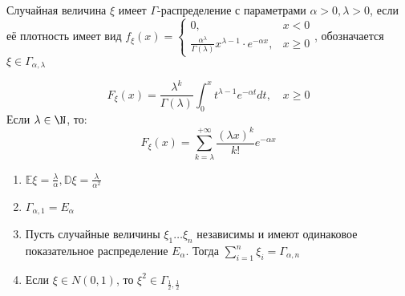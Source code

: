 \begin{definition}
    Случайная величина \(\xi\) имеет \(\Gamma\)-распределение с параметрами \(\alpha > 0, \lambda > 0\), если её плотность имеет вид \(f_\xi(x) = \begin{cases}
        0,                                                                            & x < 0    \\
        \frac{\alpha^\lambda}{\Gamma(\lambda)} x^{\lambda - 1} \cdot e^{ - \alpha x}, & x \geq 0
    \end{cases} \),
    обозначается \(\xi \in \Gamma_{\alpha, \lambda}\)
\end{definition}

\[F_\xi(x) = \frac{\lambda^k}{\Gamma(\lambda)} \int_0^x t^{\lambda - 1} e^{ - \alpha t} dt , \quad x \geq 0\]
Если \(\lambda\in\N\), то:
\[F_\xi(x) = \sum_{k = \lambda}^{+\infty} \frac{(\lambda x)^k}{k!} e^{ - \alpha x}\]

\begin{prop}\itemfix
    \begin{enumerate}
        \item \(\mathbb{E}\xi = \frac{\lambda}{\alpha}, \mathbb{D}\xi = \frac{\lambda}{\alpha^2}\)
        \item \(\Gamma_{\alpha, 1} = E_\alpha\)
        \item Пусть случайные величины \(\xi_1 \dots \xi_n\) независимы и имеют одинаковое показательное распределение \(E_\alpha\). Тогда \(\sum_{i = 1}^n \xi_i = \Gamma_{\alpha, n}\)
        \item Если \(\xi \in N(0, 1)\), то \(\xi^2 \in \Gamma_{\frac{1}{2}, \frac{1}{2}}\)
    \end{enumerate}
\end{prop}